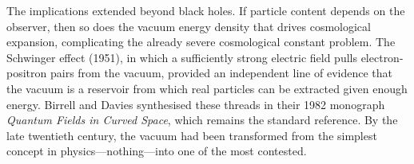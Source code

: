 \begin{historical}
The implications extended beyond black holes. If particle content depends on the observer, then so does the vacuum energy density that drives cosmological expansion, complicating the already severe cosmological constant problem. The Schwinger effect (1951), in which a sufficiently strong electric field pulls electron-positron pairs from the vacuum, provided an independent line of evidence that the vacuum is a reservoir from which real particles can be extracted given enough energy. Birrell and Davies synthesised these threads in their 1982 monograph \textit{Quantum Fields in Curved Space}, which remains the standard reference. By the late twentieth century, the vacuum had been transformed from the simplest concept in physics—nothing—into one of the most contested.
\end{historical}
